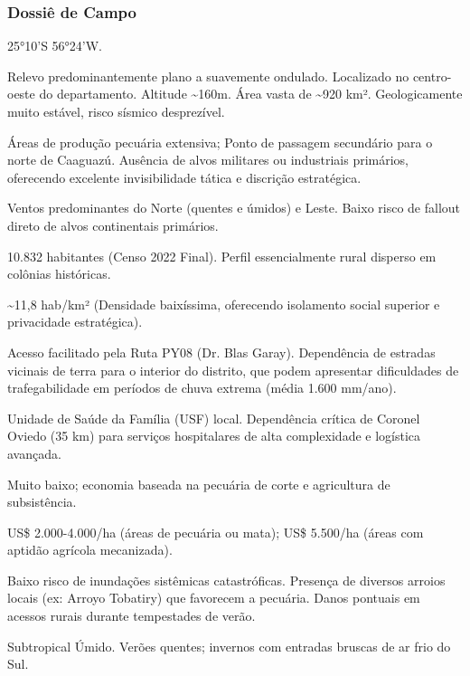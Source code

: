 \subsubsection{Dossiê de Campo}
\begin{description}[style=nextline,leftmargin=0.5cm,font=\bfseries]
\item[Coordenadas]  25°10'S 56°24'W.
\item[Topografia]  Relevo predominantemente plano a suavemente ondulado. Localizado no centro-oeste do departamento. Altitude \textasciitilde 160m. Área vasta de \textasciitilde 920 km². Geologicamente muito estável, risco sísmico desprezível.
\item[Alvos Estratégicos]  Áreas de produção pecuária extensiva; Ponto de passagem secundário para o norte de Caaguazú. Ausência de alvos militares ou industriais primários, oferecendo excelente invisibilidade tática e discrição estratégica.
\item[Fallout]  Ventos predominantes do Norte (quentes e úmidos) e Leste. Baixo risco de fallout direto de alvos continentais primários.
\item[População]  10.832 habitantes (Censo 2022 Final). Perfil essencialmente rural disperso em colônias históricas.
\item[Densidade]  \textasciitilde 11,8 hab/\allowbreak km² (Densidade baixíssima, oferecendo isolamento social superior e privacidade estratégica).
\item[Vias de Acesso]  Acesso facilitado pela Ruta PY08 (Dr. Blas Garay). Dependência de estradas vicinais de terra para o interior do distrito, que podem apresentar dificuldades de trafegabilidade em períodos de chuva extrema (média 1.600 mm/\allowbreak ano).
\item[Serviços]  Unidade de Saúde da Família (USF) local. Dependência crítica de Coronel Oviedo (35 km) para serviços hospitalares de alta complexidade e logística avançada.
\item[Custo de Vida]  Muito baixo; economia baseada na pecuária de corte e agricultura de subsistência.
\item[Preço da Terra]  US\$ 2.000-4.000/\allowbreak ha (áreas de pecuária ou mata); US\$ 5.500/\allowbreak ha (áreas com aptidão agrícola mecanizada).
\item[Hidrologia]  Baixo risco de inundações sistêmicas catastróficas. Presença de diversos arroios locais (ex: Arroyo Tobatiry) que favorecem a pecuária. Danos pontuais em acessos rurais durante tempestades de verão.
\item[Clima]  Subtropical Úmido. Verões quentes; invernos com entradas bruscas de ar frio do Sul.

\end{description}
